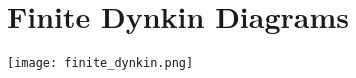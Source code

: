 
\chapter{Finite Dynkin Diagrams}
\label{AppendixB}

\begin{center}
  \texttt{[image: finite\_dynkin.png]}
\end{center}
